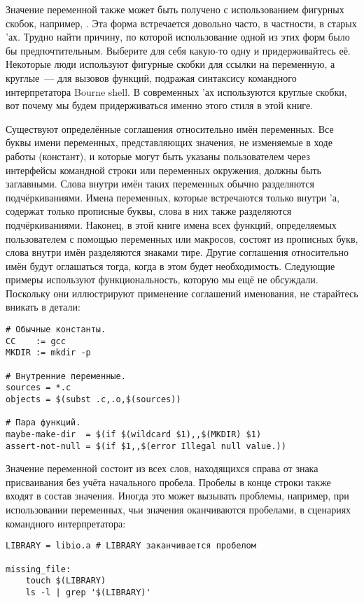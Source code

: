 Значение переменной также может быть получено с использованием
фигурных скобок, например, . Эта форма
встречается довольно часто, в частности, в старых \Makefile{}'ах.
Трудно найти причину, по которой использование одной из этих форм было
бы предпочтительным.  Выберите для себя какую-то одну и
придерживайтесь её. Некоторые люди используют фигурные скобки для
ссылки на переменную, а круглые~--- для вызовов функций, подражая
синтаксису командного интерпретатора Bourne shell. В современных
\Makefile{}'ах используются круглые скобки, вот почему мы будем
придерживаться именно этого стиля в этой книге.

Существуют определённые соглашения относительно имён переменных. Все
буквы имени переменных, представляющих значения, не изменяемые в ходе
работы \GNUmake{} (констант), и которые могут быть указаны
пользователем через интерфейсы командной строки или переменных
окружения, должны быть заглавными. Слова внутри имён таких переменных
обычно разделяются подчёркиваниями. Имена переменных, которые
встречаются только внутри \Makefile{}'а, содержат только прописные
буквы, слова в них также разделяются подчёркиваниями. Наконец, в этой
книге имена всех функций, определяемых пользователем с помощью
переменных или макросов, состоят из прописных букв, слова внутри имён
разделяются знаками тире.  Другие соглашения относительно имён будут
оглашаться тогда, когда в этом будет необходимость. Следующие примеры
используют функциональность, которую мы ещё не обсуждали. Поскольку
они иллюстрируют применение соглашений именования, не старайтесь
вникать в детали:

{\footnotesize
\begin{verbatim}
# Обычные константы.
CC    := gcc
MKDIR := mkdir -p

# Внутренние переменные.
sources = *.c
objects = $(subst .c,.o,$(sources))

# Пара функций.
maybe-make-dir  = $(if $(wildcard $1),,$(MKDIR) $1)
assert-not-null = $(if $1,,$(error Illegal null value.))
\end{verbatim}
}

Значение переменной состоит из всех слов, находящихся справа от знака
присваивания без учёта начального пробела. Пробелы в конце строки
также входят в состав значения. Иногда это может вызывать проблемы,
например, при использовании переменных, чьи значения оканчиваются
пробелами, в сценариях командного интерпретатора:

{\footnotesize
\begin{verbatim}
LIBRARY = libio.a # LIBRARY заканчивается пробелом

missing_file:
    touch $(LIBRARY)
    ls -l | grep '$(LIBRARY)'
\end{verbatim}
}


